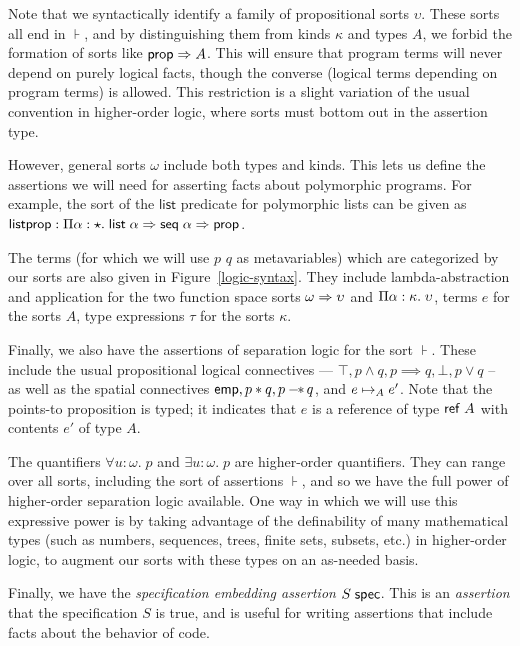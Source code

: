 Note that we syntactically identify a family of propositional sorts
$\upsilon$. These sorts all end in $\assert$, and by distinguishing
them from kinds $\kappa$ and types $A$, we forbid the formation of
sorts like $\mathsf{prop} \Rightarrow A$. This will ensure that program terms will
never depend on purely logical facts, though the converse (logical
terms depending on program terms) is allowed. This restriction is a
slight variation of the usual convention in higher-order logic, where
sorts must bottom out in the assertion type.

However, general sorts $\omega$ include both types and kinds. This
lets us define the assertions we will need for asserting facts about
polymorphic programs. For example, the sort of the $\mathsf{list}$
predicate for polymorphic lists can be given as $\mathsf{listprop} :
\Pi {\alpha}:{\star}.\;{\mathsf{list}\;{\alpha} \Rightarrow \mathsf{seq}\;{\alpha} \Rightarrow
  \mathsf{prop}}$.

The terms (for which we will use $p$ $q$ as metavariables) which are
categorized by our sorts are also given in Figure~\ref{logic-syntax}.
They include lambda-abstraction and application for the two function
space sorts $\omega \Rightarrow \upsilon$ and
$\Pi {\alpha}:{\kappa}.\;{\upsilon}$, terms $e$ for the sorts $A$,
type expressions $\tau$ for the sorts $\kappa$.

Finally, we also have the assertions of separation logic for the sort
$\assert$.  These include the usual propositional logical connectives
--- $\top, p \land q, p \implies q, \bot, p \vee q$ -- as well as the
spatial connectives $\mathsf{emp}, p * q, p -\!\!*\, q$, and $e \mapsto_A
e'$. Note that the points-to proposition is typed; it indicates that
$e$ is a reference of type $\mathsf{ref}\;A$ with contents $e'$ of type
$A$.

The quantifiers $\forall u:\omega.\; p$ and $\exists u:\omega.\; p$
are higher-order quantifiers. They can range over all sorts, including
the sort of assertions $\assert$, and so we have the full power of
higher-order separation logic available.  One way in which we will use
this expressive power is by taking advantage of the definability of
many mathematical types (such as numbers, sequences, trees, finite
sets, subsets, etc.) in higher-order logic, to augment our sorts with
these types on an as-needed basis.

Finally, we have the \emph{specification embedding assertion}
${S}\;\mathsf{spec}$.  This is an \emph{assertion} that the specification
$S$ is true, and is useful for writing assertions that include facts
about the behavior of code.

